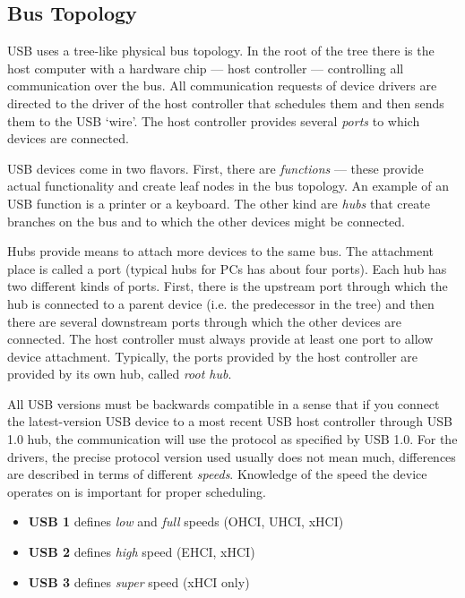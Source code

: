 \subsection{Bus Topology}

USB uses a tree-like physical bus topology. In the root of the tree there is
the host computer with a hardware chip — host controller — controlling all
communication over the bus. All communication requests of device drivers are
directed to the driver of the host controller that schedules them and then
sends them to the USB ‘wire’. The host controller provides several
\textit{ports} to which devices are connected.

USB devices come in two flavors. First, there are \textit{functions} — these
provide actual functionality and create leaf nodes in the bus topology. An
example of an USB function is a printer or a keyboard. The other kind are
\textit{hubs} that create branches on the bus and to which the other devices
might be connected.

Hubs provide means to attach more devices to the same bus. The attachment place
is called a port (typical hubs for PCs has about four ports). Each hub has two
different kinds of ports. First, there is the upstream port through which the
hub is connected to a parent device (i.e. the predecessor in the tree) and then
there are several downstream ports through which the other devices are
connected. The host controller must always provide at least one port to allow
device attachment. Typically, the ports provided by the host controller are
provided by its own hub, called \textit{root hub}.

All USB versions must be backwards compatible in a sense that if you connect
the latest-version USB device to a most recent USB host controller through
USB 1.0 hub, the communication will use the protocol as specified by USB 1.0.
For the drivers, the precise protocol version used usually does not mean much,
differences are described in terms of different \emph{speeds}. Knowledge of the
speed the device operates on is important for proper scheduling.
%
\begin{itemize}
	\item \textbf{USB 1} defines \emph{low} and \emph{full} speeds (OHCI, UHCI, xHCI)
	\item \textbf{USB 2} defines \emph{high} speed (EHCI, xHCI)
	\item \textbf{USB 3} defines \emph{super} speed (xHCI only)
\end{itemize}

